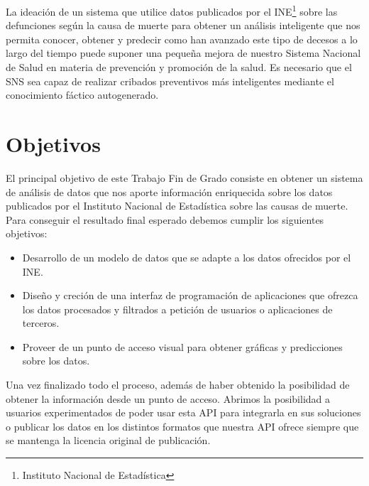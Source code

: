 La ideación de un sistema que utilice datos publicados por el INE\footnote{Instituto Nacional de Estadística} sobre las defunciones según 
la causa de muerte para obtener un análisis inteligente que nos permita conocer, obtener y predecir
como han avanzado este tipo de decesos a lo largo del tiempo puede suponer una pequeña mejora de 
nuestro Sistema Nacional de Salud en materia de prevención y promoción de la salud. Es necesario que el 
SNS sea capaz de realizar cribados preventivos más inteligentes mediante el conocimiento fáctico autogenerado.

\section{Objetivos}
El principal objetivo de este Trabajo Fin de Grado consiste en obtener un sistema de análisis de datos que nos aporte
información enriquecida sobre los datos publicados por el Instituto Nacional de Estadística sobre las causas de muerte. 
Para conseguir el resultado final esperado debemos cumplir los siguientes objetivos:
\begin{itemize}
    \item Desarrollo de un modelo de datos que se adapte a los datos ofrecidos por el INE.
    \item Diseño y creción de una interfaz de programación de aplicaciones que ofrezca los datos procesados y 
filtrados a petición de usuarios o aplicaciones de terceros.
    \item Proveer de un punto de acceso visual para obtener gráficas y predicciones sobre los datos.
\end{itemize}

Una vez finalizado todo el proceso, además de haber obtenido la posibilidad de obtener la información 
desde un punto de acceso. Abrimos la posibilidad a usuarios experimentados de poder usar esta API para 
integrarla en sus soluciones o publicar los datos en los distintos formatos que nuestra API ofrece 
siempre que se mantenga la licencia original de publicación.

